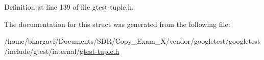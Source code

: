 Definition at line 139 of file gtest-\/tuple.\+h.



The documentation for this struct was generated from the following file\+:\begin{DoxyCompactItemize}
\item 
/home/bhargavi/\+Documents/\+S\+D\+R/\+Copy\+\_\+\+Exam\+\_\+X/vendor/googletest/googletest/include/gtest/internal/\hyperlink{gtest-tuple_8h}{gtest-\/tuple.\+h}\end{DoxyCompactItemize}
